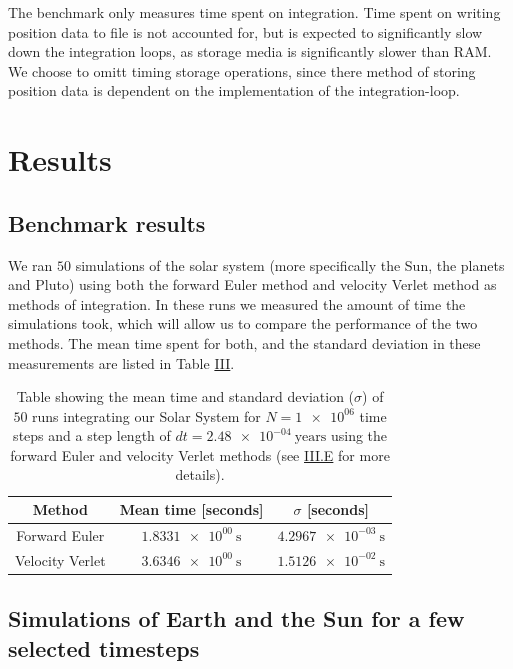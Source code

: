 \documentclass[reprint,english,notitlepage]{revtex4-1}  %
\begin{document}
The benchmark only measures time spent on integration. Time spent on writing position data to file is not accounted for, but is expected to significantly slow down the integration loops, as storage media is significantly slower than RAM. We choose to omitt timing storage operations, since there method of storing position data is dependent on the implementation of the integration-loop.

\newpage

\section{Results} \label{sec:IV}

\subsection{Benchmark results} \label{sec:IV:a}

We ran $50$ simulations of the solar system (more specifically the Sun, the planets and Pluto) using both the forward Euler method and velocity Verlet method as methods of integration. In these runs we measured the amount of time the simulations took, which will allow us to compare the performance of the two methods. The mean time spent for both, and the standard deviation in these measurements are listed in Table \hyperref[table:benchmark]{III}.

\begin{table}[H] \label{table:benchmark}
\caption{Table showing the mean time and standard deviation ($\sigma$) of \(50\) runs integrating our Solar System for \(N = \num{1e+06}\) time steps and a step length of \(dt = \SI{2.48e-04}{\text{years}}\) using the forward Euler and velocity Verlet methods (see \hyperref[sec:III:e]{III.E} for more details).}
\begin{tabular}{|c|c|c|}
\hline
Method & Mean time [seconds] & $\sigma$ [seconds] \\
\hline 
Forward Euler & \(\SI{1.8331e+00}{\second}\) & \(\SI{4.2967e-03}{\second}\) \\
Velocity Verlet &  \(\SI{3.6346e+00}{\second}\) & \(\SI{1.5126e-02}{\second}\)\\
\hline
\end{tabular}
\end{table} 

\subsection{Simulations of Earth and the Sun for a few selected timesteps} \label{sec:IV:b}
\end{document}
